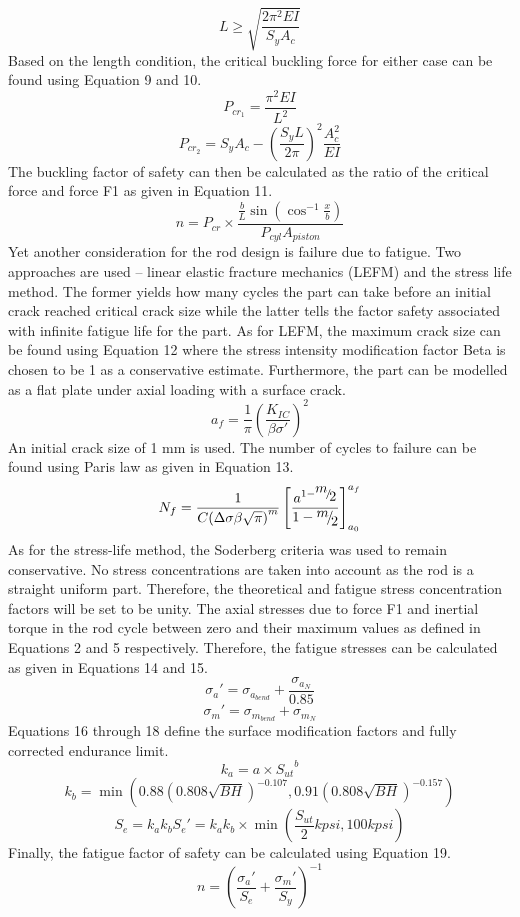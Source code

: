 \documentclass[10pt,a4paper]{article}
\begin{document}
\[L \ge \sqrt {\frac{{2{\pi ^2}EI}}{{{S_y}{A_c}}}} \]
Based on the length condition, the critical buckling force for either case can be found using Equation 9 and 10.
\[{P_{c{r_1}}} = \frac{{{\pi ^2}EI}}{{{L^2}}}\]
\[{P_{c{r_2}}} = {S_y}{A_c} - {\left( {\frac{{{S_y}L}}{{2\pi }}} \right)^2}\frac{{A_c^2}}{{EI}}\]
The buckling factor of safety can then be calculated as the ratio of the critical force and force F1 as given in Equation 11.
\[n = {P_{cr}} \times \frac{{\frac{b}{L}\sin ({{\cos }^{ - 1}}\frac{x}{b})}}{{{P_{cyl}}{A_{piston}}}}\]
Yet another consideration for the rod design is failure due to fatigue. Two approaches are used – linear elastic fracture mechanics (LEFM) and the stress life method. The former yields how many cycles the part can take before an initial crack reached critical crack size while the latter tells the factor safety associated with infinite fatigue life for the part.
As for LEFM, the maximum crack size can be found using Equation 12 where the stress intensity modification factor Beta is chosen to be 1 as a conservative estimate. Furthermore, the part can be modelled as a flat plate under axial loading with a surface crack.
\[{a_f} = \frac{1}{\pi }{\left( {\frac{{{K_{IC}}}}{{\beta \sigma '}}} \right)^2}\]
An initial crack size of 1 mm is used. The number of cycles to failure can be found using Paris law as given in Equation 13.
\[{N_f} = \frac{1}{{C{{\left( {\Delta \sigma \beta \sqrt \pi  } \right)}^m}}}\left[ {\frac{{{a^{1 - {\raise0.7ex\hbox{$m$} \!\mathord{\left/
 {\vphantom {m 2}}\right.\kern-\nulldelimiterspace}
\!\lower0.7ex\hbox{$2$}}}}}}{{1 - {\raise0.7ex\hbox{$m$} \!\mathord{\left/
 {\vphantom {m 2}}\right.\kern-\nulldelimiterspace}
\!\lower0.7ex\hbox{$2$}}}}} \right]_{{a_0}}^{{a_f}}\]
As for the stress-life method, the Soderberg criteria was used to remain conservative. No stress concentrations are taken into account as the rod is a straight uniform part. Therefore, the theoretical and fatigue stress concentration factors will be set to be unity. The axial stresses due to force F1 and inertial torque in the rod cycle between zero and their maximum values as defined in Equations 2 and 5 respectively. Therefore, the fatigue stresses can be calculated as given in Equations 14 and 15.
\[{\sigma _a}' = {\sigma _{{a_{bend}}}} + \frac{{{\sigma _{{a_N}}}}}{{0.85}}\]
\[{\sigma _m}' = {\sigma _{{m_{bend}}}} + {\sigma _{{m_N}}}\]
Equations 16 through 18 define the surface modification factors and fully corrected endurance limit.
\[{k_a} = a \times {S_{ut}}^b\]
\[{k_b} = \min \left( {0.88{{\left( {0.808\sqrt {BH} } \right)}^{ - 0.107}},0.91{{\left( {0.808\sqrt {BH} } \right)}^{ - 0.157}}} \right)\]
\[{S_e} = {k_a}{k_b}{S_e}' = {k_a}{k_b} \times \min \left( {\frac{{{S_{ut}}}}{2}kpsi,100kpsi} \right)\]
Finally, the fatigue factor of safety can be calculated using Equation 19.
\[n = {\left( {\frac{{{\sigma _a}'}}{{{S_e}}} + \frac{{{\sigma _m}'}}{{{S_y}}}} \right)^{ - 1}}\]
\newpage
\end{document}
